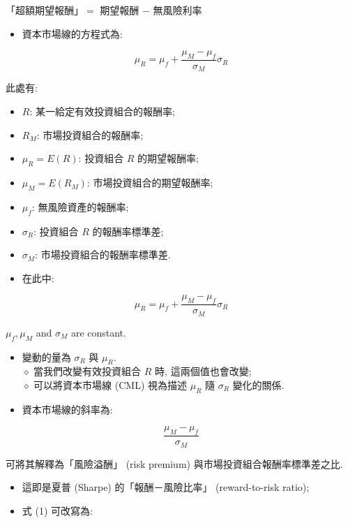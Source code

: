 \documentclass[letterpaper]{article}
\begin{document}
		「超額期望報酬」$=$ 期望報酬 $-$ 無風險利率
		
		\begin{itemize}
			\item 資本市場線的方程式為: 
		\end{itemize}
		
		
		
		$$
			\mu_{R}=\mu_{f}+\frac{\mu_{M}-\mu_{f}}{\sigma_{M}} \sigma_{R} 
		$$
		
		
		此處有: 
		
		\begin{itemize}
			\item $R$: 某一給定有效投資組合的報酬率; 
			\item $R_{M}$: 市場投資組合的報酬率; 
			\item $\mu_{R} = E (R) $: 投資組合 $R$ 的期望報酬率; 
			\item $\mu_{M} = E (R_{M}) $: 市場投資組合的期望報酬率; 
			\item $\mu_{f}$: 無風險資產的報酬率; 
			\item $\sigma_{R}$: 投資組合 $R$ 的報酬率標準差; 
			\item $\sigma_{M}$: 市場投資組合的報酬率標準差. 
		\end{itemize}
		
		
		\begin{itemize}
			\item 在此中: 
		\end{itemize}
		
		$$
		\mu_{R}=\mu_{f}+\frac{\mu_{M}-\mu_{f}}{\sigma_{M}} \sigma_{R}
		$$
		
		$\mu_{f}, \mu_{M}$ and $\sigma_{M}$ are constant.
		
		\begin{itemize}
			\item 變動的量為 $\sigma_{R}$ 與 $\mu_{R}$. \\
			$\diamond$ 當我們改變有效投資組合 $R$ 時, 這兩個值也會改變; \\
			$\diamond$ 可以將資本市場線 (CML) 視為描述 $\mu_{R}$ 隨 $\sigma_{R}$ 變化的關係. 
			\item 資本市場線的斜率為: 
		\end{itemize}
		
		
		$$
		\frac{\mu_{M}-\mu_{f}}{\sigma_{M}}
		$$
		
		可將其解釋為「風險溢酬」 (risk premium) 與市場投資組合報酬率標準差之比. 
		
		\begin{itemize}
			\item 這即是夏普 (Sharpe) 的「報酬－風險比率」 (reward-to-risk ratio); 
			\item 式 (1) 可改寫為: 
		\end{itemize}
		
\end{document}
